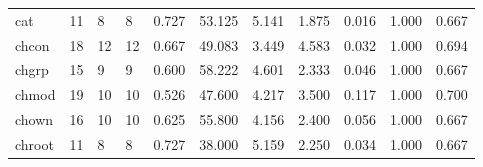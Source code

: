 \begin{longtable}{lp{1.8cm}p{1.8cm}p{1.8cm}p{1.8cm}p{1.8cm}p{1.8cm}p{1.8cm}p{1.8cm}p{1.8cm}p{1.8cm}}
cat       &                           11 &                  8 &                                 8 &                                      0.727 &                                 53.125 &                                        5.141 &                             1.875 &                                   0.016 &                              1.000 &                                              0.667 \\
chcon     &                           18 &                 12 &                                12 &                                      0.667 &                                 49.083 &                                        3.449 &                             4.583 &                                   0.032 &                              1.000 &                                              0.694 \\
chgrp     &                           15 &                  9 &                                 9 &                                      0.600 &                                 58.222 &                                        4.601 &                             2.333 &                                   0.046 &                              1.000 &                                              0.667 \\
chmod     &                           19 &                 10 &                                10 &                                      0.526 &                                 47.600 &                                        4.217 &                             3.500 &                                   0.117 &                              1.000 &                                              0.700 \\
chown     &                           16 &                 10 &                                10 &                                      0.625 &                                 55.800 &                                        4.156 &                             2.400 &                                   0.056 &                              1.000 &                                              0.667 \\
chroot    &                           11 &                  8 &                                 8 &                                      0.727 &                                 38.000 &                                        5.159 &                             2.250 &                                   0.034 &                              1.000 &                                              0.667 \\

\end{longtable}
